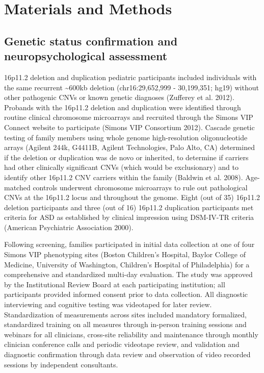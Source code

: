 \documentclass[]{article}
\begin{document}
\section{Materials and Methods}\label{materials-and-methods}

\subsection{Genetic status confirmation and neuropsychological
assessment}\label{genetic-status-confirmation-and-neuropsychological-assessment}

16p11.2 deletion and duplication pediatric participants included
individuals with the same recurrent \textasciitilde{}600kb deletion
(chr16:29,652,999 - 30,199,351; hg19) without other pathogenic CNVs or
known genetic diagnoses (Zufferey et al. 2012). Probands with the
16p11.2 deletion and duplication were identified through routine
clinical chromosome microarrays and recruited through the Simons VIP
Connect website to participate (Simons VIP Consortium 2012). Cascade
genetic testing of family members using whole genome high-resolution
oligonucleotide arrays (Agilent 244k, G4411B, Agilent Technologies, Palo
Alto, CA) determined if the deletion or duplication was de novo or
inherited, to determine if carriers had other clinically significant
CNVs (which would be exclusionary) and to identify other 16p11.2 CNV
carriers within the family (Baldwin et al. 2008). Age-matched controls
underwent chromosome microarrays to rule out pathological CNVs at the
16p11.2 locus and throughout the genome. Eight (out of 35) 16p11.2
deletion participants and three (out of 16) 16p11.2 duplication
participants met criteria for ASD as established by clinical impression
using DSM-IV-TR criteria (American Psychiatric Association 2000).

Following screening, families participated in initial data collection at
one of four Simons VIP phenotyping sites (Boston Children's Hospital,
Baylor College of Medicine, University of Washington, Children's
Hospital of Philadelphia) for a comprehensive and standardized multi-day
evaluation. The study was approved by the Institutional Review Board at
each participating institution; all participants provided informed
consent prior to data collection. All diagnostic interviewing and
cognitive testing was videotaped for later review. Standardization of
measurements across sites included mandatory formalized, standardized
training on all measures through in-person training sessions and
webinars for all clinicians, cross-site reliability and maintenance
through monthly clinician conference calls and periodic videotape
review, and validation and diagnostic confirmation through data review
and observation of video recorded sessions by independent consultants.
\end{document}
